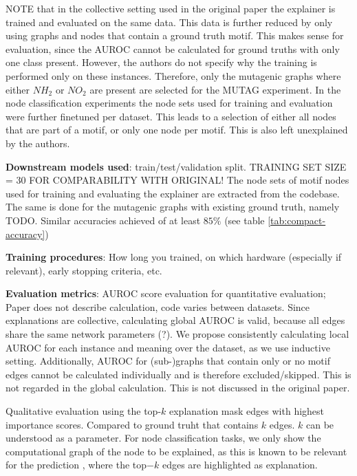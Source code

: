 NOTE that in the collective setting used in the original paper the explainer is trained and evaluated on the same data. This data is further reduced by only using graphs and nodes that contain a ground truth motif. This makes sense for evaluation, since the AUROC cannot be calculated for ground truths with only one class present. However, the authors do not specify why the training is performed only on these instances. Therefore, only the mutagenic graphs where either $NH_2$ or $NO_2$ are present are selected for the MUTAG experiment. In the node classification experiments the node sets used for training and evaluation were further finetuned per dataset. This leads to a selection of either all nodes that are part of a motif, or only one node per motif. This is also left unexplained by the authors.



\textbf{Downstream models used}: train/test/validation split. TRAINING SET SIZE = 30 FOR COMPARABILITY WITH ORIGINAL! The node sets of motif nodes used for training and evaluating the explainer are extracted from the codebase. The same is done for the mutagenic graphs with existing ground truth, namely TODO. Similar accuracies achieved of at least $85\%$ (see table \ref{tab:compact-accuracy})

\textbf{Training procedures}: How long you trained, on which hardware (especially if relevant), early stopping criteria, etc.

\textbf{Evaluation metrics}: AUROC score evaluation for quantitative evaluation; Paper does not describe calculation, code varies between datasets. Since explanations are collective, calculating global AUROC is valid, because all edges share the same network parameters (?). We propose consistently calculating local AUROC for each instance and meaning over the dataset, as we use inductive setting. Additionally, AUROC for (sub-)graphs that contain only or no motif edges cannot be calculated individually and is therefore excluded/skipped. This is not regarded in the global calculation. This is not discussed in the original paper.

Qualitative evaluation using the top-$k$ explanation mask edges with highest importance scores. Compared to ground truht that contains $k$ edges. $k$ can be understood as a parameter. For node classification tasks, we only show the computational graph of the node to be explained, as this is known to be relevant for the prediction \cite{}, where the top$-k$ edges are highlighted as explanation.

